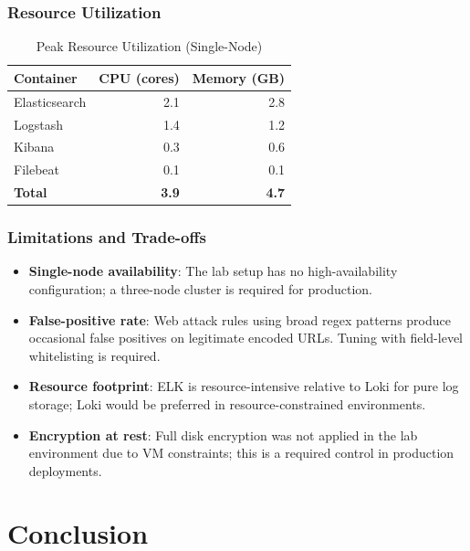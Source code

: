 \documentclass[12pt,a4paper]{report}
\begin{document}
\subsection{Resource Utilization}

\begin{table}[H]
\centering
\caption{Peak Resource Utilization (Single-Node)}
\label{tab:resources}
\begin{tabular}{lrr}
\toprule
\textbf{Container} & \textbf{CPU (cores)} & \textbf{Memory (GB)} \\
\midrule
Elasticsearch & 2.1 & 2.8 \\
Logstash      & 1.4 & 1.2 \\
Kibana        & 0.3 & 0.6 \\
Filebeat      & 0.1 & 0.1 \\
\textbf{Total}& \textbf{3.9} & \textbf{4.7} \\
\bottomrule
\end{tabular}
\end{table}

\subsection{Limitations and Trade-offs}

\begin{itemize}[leftmargin=1.5em]
    \item \textbf{Single-node availability}: The lab setup has no high-availability
          configuration; a three-node cluster is required for production.
    \item \textbf{False-positive rate}: Web attack rules using broad regex patterns
          produce occasional false positives on legitimate encoded URLs.
          Tuning with field-level whitelisting is required.
    \item \textbf{Resource footprint}: ELK is resource-intensive relative to Loki
          for pure log storage; Loki would be preferred in resource-constrained
          environments.
    \item \textbf{Encryption at rest}: Full disk encryption was not applied in the
          lab environment due to VM constraints; this is a required control in
          production deployments.
\end{itemize}


\chapter{Conclusion}
\label{chap:conclusion}
\end{document}

